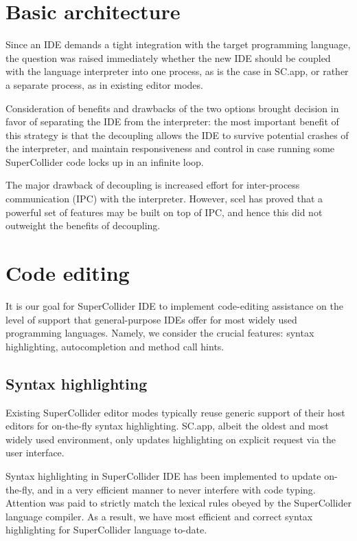 \documentclass[11pt,a4paper]{article}
\begin{document}
\section{Basic architecture}

Since an IDE demands a tight integration with the target programming language, the question was
raised immediately whether the new IDE should be coupled with the language interpreter into one
process, as is the case in SC.app, or rather a separate process, as in existing editor modes.

Consideration of benefits and drawbacks of the two options brought decision in favor of
separating the IDE from the interpreter: the most important benefit of this strategy is that the
decoupling allows the IDE to survive potential crashes of the interpreter, and maintain
responsiveness and control in case running some SuperCollider code locks up in an infinite loop.

The major drawback of decoupling is increased effort for inter-process communication (IPC) with the
interpreter. However, scel has proved that a powerful set of features may be built on top of IPC,
and hence this did not outweight the benefits of decoupling.

\section{Code editing}

It is our goal for SuperCollider IDE to implement code-editing assistance on the level of support
that general-purpose IDEs offer for most widely used programming languages. Namely,
we consider the crucial features: syntax highlighting, autocompletion and method call hints.

\subsection{Syntax highlighting}

Existing SuperCollider editor modes typically reuse generic support of their host editors for
on-the-fly syntax highlighting. SC.app, albeit the oldest and most widely used environment, only
updates highlighting on explicit request via the user interface.

Syntax highlighting in SuperCollider IDE has been implemented to update on-the-fly, and in a very
efficient manner to never interfere with code typing. Attention was paid to strictly match the
lexical rules obeyed by the SuperCollider language compiler. As a result, we have most efficient and
correct syntax highlighting for SuperCollider language to-date.
\end{document}
